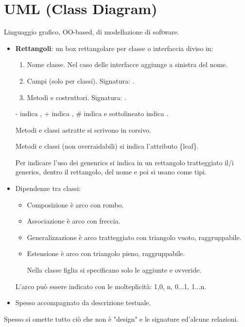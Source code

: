 \section{UML (Class Diagram)}
Linguaggio grafico, OO-based, di modellazione di software.
\begin{itemize}
	\item \textbf{Rettangoli}: un box rettangolare per classe o interfaccia diviso in:
	\begin{enumerate}
		\item Nome classe. Nel caso delle interfacce aggiunge  a sinistra del nome.
		\item Campi (solo per classi). Signatura: .
		\item Metodi e costruttori. Signatura: .
	\end{enumerate}
	- indica , + indica , \# indica  e sottolineato indica .

	Metodi e classi astratte si scrivono in corsivo.

	Metodi e classi  (non overraidabili) si indica l'attributo \{leaf\}.

	Per indicare l'uso dei genenrics si indica in un rettangolo tratteggiato il/i generics, dentro il rettangolo, del nome e poi si usano come tipi.
	\item Dipendenze tra classi:
	\begin{itemize}
		\item Composizione è arco con rombo.
		\item Associazione è arco con freccia.
		\item Generalizzazione è arco tratteggiato con triangolo vuoto, raggruppabile.
		\item Estensione è arco con triangolo pieno, raggruppabile.

		Nella classe figlia si specificano solo le aggiunte e ovveride.
	\end{itemize}
	L'arco può essere indicato con le molteplicità: 1,0, n, 0...1, 1...n.

	\item Spesso accompagnato da descrizione testuale.
\end{itemize}

Spesso si omette tutto ciò che non è "design" e le signature ed'alcune relazioni.
